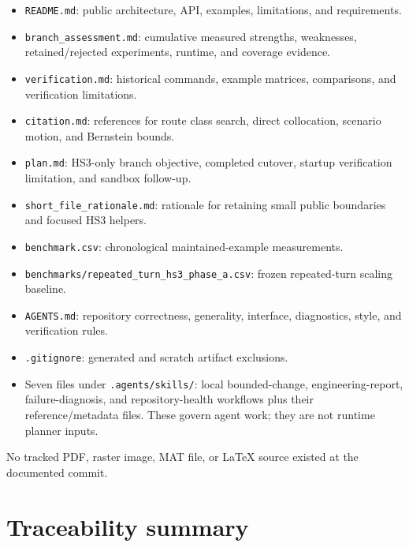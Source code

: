 \documentclass[10pt,letterpaper]{article}
\newcommand{\file}[1]{\nolinkurl{#1}}
\begin{document}
\begin{itemize}
  \item \file{README.md}: public architecture, API, examples, limitations, and
  requirements.
  \item \file{branch_assessment.md}: cumulative measured strengths,
  weaknesses, retained/rejected experiments, runtime, and coverage evidence.
  \item \file{verification.md}: historical commands, example matrices,
  comparisons, and verification limitations.
  \item \file{citation.md}: references for route class search, direct collocation,
  scenario motion, and Bernstein bounds.
  \item \file{plan.md}: HS3-only branch objective, completed cutover, startup
  verification limitation, and sandbox follow-up.
  \item \file{short_file_rationale.md}: rationale for retaining small public
  boundaries and focused HS3 helpers.
  \item \file{benchmark.csv}: chronological maintained-example measurements.
  \item \file{benchmarks/repeated_turn_hs3_phase_a.csv}: frozen repeated-turn
  scaling baseline.
  \item \file{AGENTS.md}: repository correctness, generality, interface,
  diagnostics, style, and verification rules.
  \item \file{.gitignore}: generated and scratch artifact exclusions.
  \item Seven files under \file{.agents/skills/}: local bounded-change,
  engineering-report, failure-diagnosis, and repository-health workflows plus
  their reference/metadata files. These govern agent work; they are not runtime
  planner inputs.
\end{itemize}

No tracked PDF, raster image, MAT file, or LaTeX source existed at the
documented commit.

\section{Traceability summary}
\end{document}
